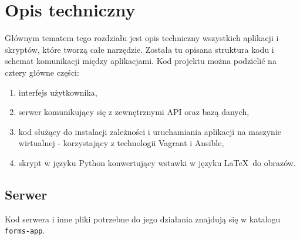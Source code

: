 \chapter{Opis techniczny}
Głównym tematem tego rozdziału jest opis techniczny wszystkich aplikacji i skryptów, które 
tworzą całe narzędzie. Została tu opisana struktura kodu i schemat komunikacji między 
aplikacjami.
Kod projektu można podzielić na cztery główne części:
\begin{enumerate}
  \item interfejs użytkownika,
  \item serwer komunikujący się z zewnętrznymi API oraz bazą danych,
  \item kod służący do instalacji zależności i uruchamiania aplikacji na maszynie wirtualnej 
  - korzystający z technologii Vagrant i Ansible,
  \item skrypt w języku Python konwertujący wstawki w języku \LaTeX\ do obrazów.
\end{enumerate}

\section{Serwer}
Kod serwera i inne pliki potrzebne do jego działania znajdują się w katalogu \texttt{forms-app}.

